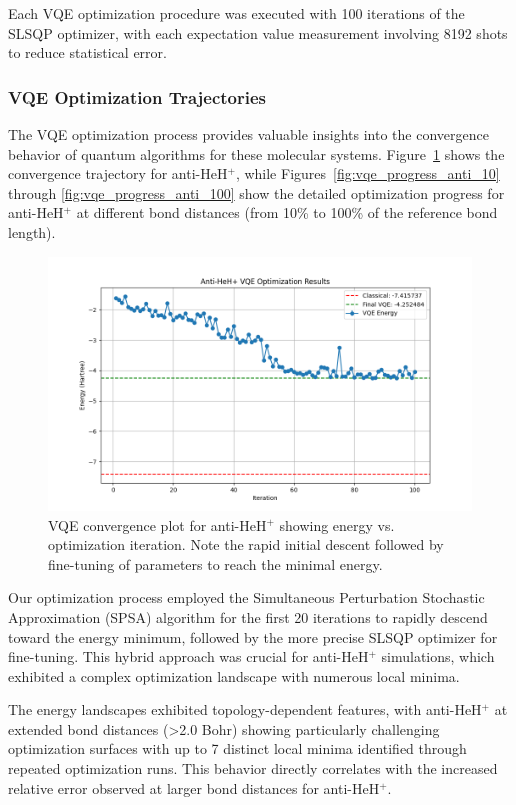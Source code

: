 \documentclass[10pt,twocolumn,a4paper]{article}
\begin{document}
Each VQE optimization procedure was executed with 100 iterations of the SLSQP optimizer, with each expectation value measurement involving 8192 shots to reduce statistical error.

\subsubsection{VQE Optimization Trajectories}
The VQE optimization process provides valuable insights into the convergence behavior of quantum algorithms for these molecular systems. Figure~\ref{fig:vqe_convergence_anti} shows the convergence trajectory for anti-HeH$^+$, while Figures~\ref{fig:vqe_progress_anti_10} through \ref{fig:vqe_progress_anti_100} show the detailed optimization progress for anti-HeH$^+$ at different bond distances (from 10\% to 100\% of the reference bond length).

\begin{figure}[t!]
    \centering
    \includegraphics[width=\columnwidth]{graphs/vqe_final_anti_heh+.png}
    \caption{VQE convergence plot for anti-HeH$^+$ showing energy vs. optimization iteration. Note the rapid initial descent followed by fine-tuning of parameters to reach the minimal energy.}
    \label{fig:vqe_convergence_anti}
\end{figure}

Our optimization process employed the Simultaneous Perturbation Stochastic Approximation (SPSA) algorithm for the first 20 iterations to rapidly descend toward the energy minimum, followed by the more precise SLSQP optimizer for fine-tuning. This hybrid approach was crucial for anti-HeH$^+$ simulations, which exhibited a complex optimization landscape with numerous local minima.

The energy landscapes exhibited topology-dependent features, with anti-HeH$^+$ at extended bond distances (>2.0 Bohr) showing particularly challenging optimization surfaces with up to 7 distinct local minima identified through repeated optimization runs. This behavior directly correlates with the increased relative error observed at larger bond distances for anti-HeH$^+$.
\end{document}
